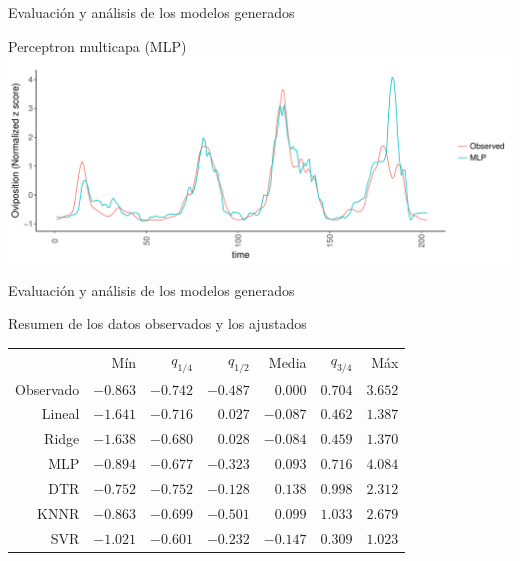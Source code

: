 \documentclass[10pt]{beamer}
\begin{document}
\begin{frame}{Evaluación y análisis de los modelos generados}
  \begin{center}
    Perceptron multicapa (MLP)
    \includegraphics[width=1\textwidth]{mlp}
  \end{center}
\end{frame}




\begin{frame}{Evaluación y análisis de los modelos generados}

\centering
Resumen de los datos observados y los ajustados
\begin{tabular}{*7{r}}
\toprule
&Mín	&$q_{1/4}$	&$q_{1/2}$	&Media	&$q_{3/4}$	&Máx\\ \cmidrule(lr){2-7}
Observado	&$-0.863$	&$-0.742$	&$-0.487$	&$0.000$	&$0.704$	&$3.652$\\
Lineal	&$-1.641$	&$-0.716$	&$ 0.027$	&$-0.087$	&$0.462$	&$1.387$\\
Ridge	&$-1.638$	&$-0.680$	&$ 0.028$	&$-0.084$	&$0.459$	&$1.370$\\
MLP	&$-0.894$	&$-0.677$	&$-0.323$	&$0.093$	&$0.716$	&$4.084$\\
DTR	&$-0.752$	&$-0.752$	&$-0.128$	&$0.138$	&$0.998$	&$2.312$\\
KNNR	&$-0.863$	&$-0.699$	&$-0.501$	&$0.099$	&$1.033$	&$2.679$\\
SVR	&$-1.021$	&$-0.601$	&$-0.232$	&$-0.147$	&$0.309$	&$1.023$\\
\bottomrule
\end{tabular}
\end{frame}
\end{document}
